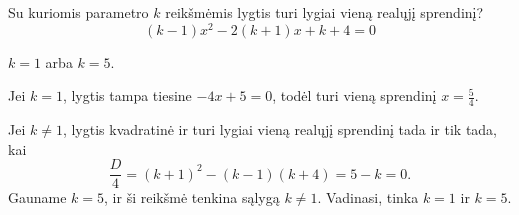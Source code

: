 \begin{salyga}
Su kuriomis parametro $k$ reikšmėmis lygtis turi lygiai vieną realųjį sprendinį?
    \[ (k - 1)x^2 - 2(k + 1)x + k + 4 = 0 \]
\end{salyga}

\begin{atsakymas}
$k=1$ arba $k=5$.
\end{atsakymas}

\begin{sprendimas}
Jei $k=1$, lygtis tampa tiesine $-4x+5=0$, todėl turi vieną sprendinį $x=\frac54$.

Jei $k\ne1$, lygtis kvadratinė ir turi lygiai vieną realųjį sprendinį tada ir tik tada, kai
\[
\frac D4=(k+1)^2-(k-1)(k+4)=5-k=0.
\]
Gauname $k=5$, ir ši reikšmė tenkina sąlygą $k\ne1$. Vadinasi, tinka $k=1$ ir $k=5$.
\end{sprendimas}
